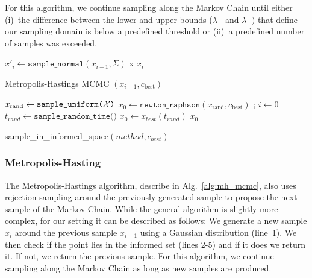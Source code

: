\documentclass[letterpaper, 10 pt, conference]{ieeeconf}  %
\begin{document}
For this algorithm, we continue sampling along the Markov Chain until either 
(i)~the difference between the lower and upper bounds ($\lambda^-$ and $\lambda^+)$ 
that define our sampling domain is below a predefined threshold or
(ii)~a predefined number of samples was exceeded.


\begin{algorithm}[t]
	\begin{algorithmic}[1]
	    \LOOP
		\STATE $ x'_{i} \leftarrow \texttt{sample\_normal}(x_{i-1},\Sigma) $ 
		\label{start}
		\STATE x
 		\ENDIF
		  \RETURN $x_{i}$
		\ENDIF 
		\ENDLOOP
	\end{algorithmic}
	\caption{Metropolis-Hastings MCMC $(x_{i-1}, c_{\text{best}})$}
	\label{alg:mh_mcmc}	
\end{algorithm}

\begin{algorithm}[t]
	\begin{algorithmic}[1]
		\STATE $x_{\text{rand}} \leftarrow \texttt{sample\_uniform(\ensuremath{\mathcal{X}})}$
		\STATE $x_{0} \leftarrow \texttt{newton\_raphson}(x_{\text{rand}}, c_{\text{best}})$ ; \hspace{3mm} $i\leftarrow 0$
	    \STATE $t_{rand} \leftarrow \texttt{sample\_random\_time()}$
	    \STATE $x_{0} \leftarrow x_{best}(t_{rand})$
	\ENDIF
	\RETURN $x_0$
	\end{algorithmic}
	\caption{sample\_in\_informed\_space$(method, c_{best})$}
	\label{alg:sample_inf}	
\end{algorithm}

\subsubsection{Metropolis-Hasting}

The Metropolis-Hastings algorithm, describe in Alg.~\ref{alg:mh_mcmc}, also uses rejection sampling around the previously generated sample to propose the next sample of the Markov Chain.
While the general algorithm is slightly more complex, for our setting it can be described as follows:
We generate a new sample $ x_{i}$ around the previous sample $ x_{i-1}$ using a Gaussian distribution (line~1).
We then check if the point lies in the informed set (lines 2-5) and if it does we return it.
If not, we return the previous sample.
%
For this algorithm, we continue sampling along the Markov Chain as long as new samples are produced.
\end{document}
